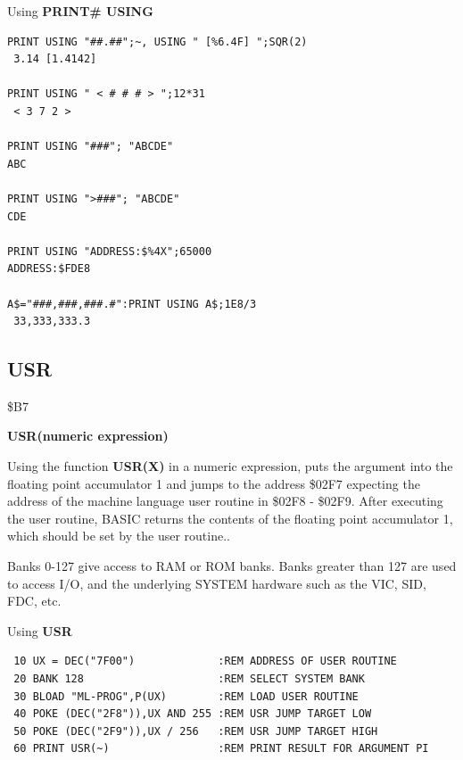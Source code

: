 \begin{description}[leftmargin=2cm,style=nextline]
\newpage
\item [Example:] Using {\bf PRINT\# USING}

\begin{tcolorbox}[colback=black,coltext=white]
\verbatimfont{\codefont}
\begin{verbatim}
PRINT USING "##.##";~, USING " [%6.4F] ";SQR(2)
 3.14 [1.4142]

PRINT USING " < # # # > ";12*31
 < 3 7 2 >

PRINT USING "###"; "ABCDE"
ABC

PRINT USING ">###"; "ABCDE"
CDE

PRINT USING "ADDRESS:$%4X";65000
ADDRESS:$FDE8

A$="###,###,###.#":PRINT USING A$;1E8/3
 33,333,333.3
\end{verbatim}
\end{tcolorbox}
\end{description}


\newpage
\subsection{USR}
\begin{description}[leftmargin=2cm,style=nextline]
\item [Token:] \$B7
\item [Format:] {\bf USR(numeric expression)}
\item [Usage:]  Using the function {\bf USR(X)} in a numeric
                expression, puts the argument into the
                floating point accumulator 1 and jumps to the
                address \$02F7 expecting the address of the
                machine language user routine in \$02F8 - \$02F9.
                After executing the user routine, BASIC returns
                the contents of the floating point accumulator 1,
                which should be set by the user routine..

\item [Remarks:] Banks 0-127 give access to RAM or ROM banks.
                 Banks greater than 127 are used to access I/O, and the underlying SYSTEM hardware such as the
                 VIC, SID, FDC, etc.
\item [Example:] Using {\bf USR}

\begin{tcolorbox}[colback=black,coltext=white]
\verbatimfont{\codefont}
\begin{verbatim}
 10 UX = DEC("7F00")             :REM ADDRESS OF USER ROUTINE
 20 BANK 128                     :REM SELECT SYSTEM BANK
 30 BLOAD "ML-PROG",P(UX)        :REM LOAD USER ROUTINE
 40 POKE (DEC("2F8")),UX AND 255 :REM USR JUMP TARGET LOW
 50 POKE (DEC("2F9")),UX / 256   :REM USR JUMP TARGET HIGH
 60 PRINT USR(~)                 :REM PRINT RESULT FOR ARGUMENT PI
\end{verbatim}
\end{tcolorbox}
\end{description}

